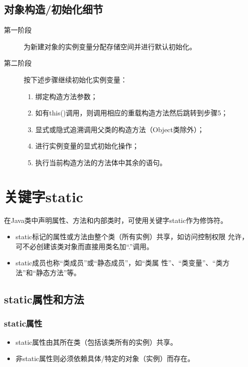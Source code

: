   


\subsection{对象构造/初始化细节}

\begin{description}
\item [第一阶段] 为新建对象的实例变量分配存储空间并进行默认初始化。
\item [第二阶段] 按下述步骤继续初始化实例变量：
  \begin{enumerate}
  \item 绑定构造方法参数；
  \item 如有this()调用，则调用相应的重载构造方法然后跳转到步骤5；
  \item 显式或隐式追溯调用父类的构造方法（Object类除外）；
  \item 进行实例变量的显式初始化操作；
  \item 执行当前构造方法的方法体中其余的语句。 
  \end{enumerate}
\end{description}

\section{关键字static}

在Java类中声明{\hei\Red 属性、方法和内部类}时，可使用关键字static作为修饰符。

\begin{itemize}
\item static标记的属性或方法由整个类（所有实例）共享，如访问控制权限
  允许，可不必创建该类对象而直接用类名加“.”调用。
\item static成员也称{\hei\Blue “类成员”或“静态成员”}，如“类属
  性”、“类变量”、“类方法”和“静态方法”等。
\end{itemize}

\subsection{static属性和方法}

\subsubsection{static属性}

\begin{itemize}
\item static属性由其所在类（包括该类所有的实例）共享。
\item 非static属性则必须依赖具体/特定的对象（实例）而存在。
\end{itemize}

